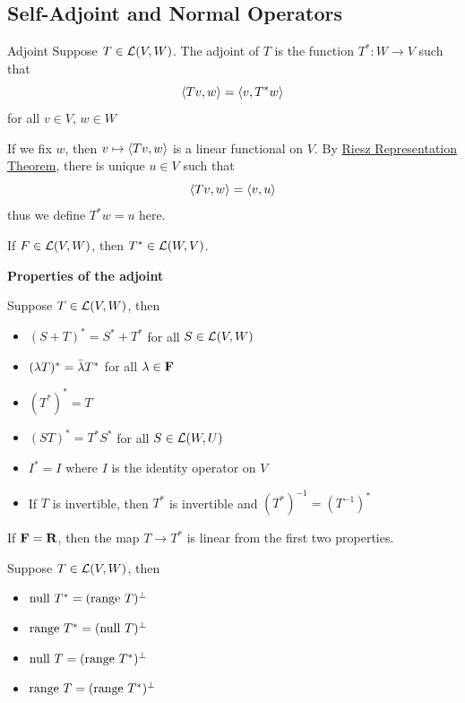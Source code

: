 \documentclass[12pt,a4paper]{article}
\begin{document}
    \subsection{Self-Adjoint and Normal Operators}
    \begin{defi}{Adjoint}%
        Suppose $T\in\mathcal{L}(V,W)$. The adjoint of $T$ is the function $T^*:W\to V$ such that 
        $$
        \langle Tv,w\rangle=\langle v,T^*w\rangle
        $$
        for all $v\in V$, $w\in W$
    \end{defi}
    \begin{remark}
        If we fix $w$, then $v\mapsto\langle Tv,w\rangle$ is a linear functional on $V$. By \hyperref[6.25]{Riesz Representation Theorem}, there is unique $u\in V$ such that 
        $$
        \langle Tv,w\rangle=\langle v,u\rangle
        $$
        thus we define $T^*w=u$ here.
    \end{remark}
    \begin{prop}
        If $F\in\mathcal{L}(V,W)$, then $T^*\in\mathcal{L}(W,V)$.
    \end{prop}
    \hfill
    
    \begin{prop}
        \textbf{Properties of the adjoint}
        
        Suppose $T\in\mathcal{L}(V,W)$, then
        \begin{itemize}
            \item $(S+T)^*=S^*+T^*$ for all $S\in\mathcal{L}(V,W)$
            \item $(\lambda T)^*=\Bar{\lambda}T^*$ for all $\lambda\in\mathbf{F}$
            \item $(T^*)^*=T$
            \item $(ST)^*=T^*S^*$ for all $S\in\mathcal{L}(W,U)$
            \item $I^*=I$ where $I$ is the identity operator on $V$
            \item If $T$ is invertible, then $T^*$ is invertible and $(T^*)^{-1}=(T^{-1})^*$
        \end{itemize}
    \end{prop}
    \begin{remark}
        If $\mathbf{F}=\mathbf{R}$, then the map $T\to T^*$ is linear from the first two properties.
    \end{remark}
    \hfill

    \begin{prop}\label{7.4}
        Suppose $T\in\mathcal{L}(V,W)$, then
        \begin{itemize}
            \item $\operatorname{null\,} T^*=(\operatorname{range\,} T)^{\perp}$
            \item $\operatorname{range\,} T^*=(\operatorname{null\,} T)^{\perp}$
            \item $\operatorname{null\,} T=(\operatorname{range\,} T^*)^{\perp}$
            \item $\operatorname{range\,} T=(\operatorname{range\,} T^*)^{\perp}$
        \end{itemize}
    \end{prop}
    \hfill
\end{document}
